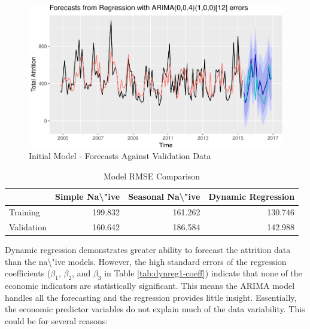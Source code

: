 \documentclass[12pt,letterpaper,toc=flat,oneside]{report}
\theoremstyle{definition}
\theoremstyle{definition}
\theoremstyle{definition}
\theoremstyle{remark}
\begin{document}
\begin{figure}[H]

{\centering \includegraphics{elliott-econometric-personnel-retention-18_files/figure-latex/dynreg1-forecast-1} 

}

\caption{Initial Model - Forecasts Against Validation Data}\label{fig:dynreg1-forecast}
\end{figure}

\begin{table}[!h]

\caption{\label{tab:model-compare-1}Model RMSE Comparison}
\centering
\begin{tabular}[t]{lrrr}
\toprule
\bfseries{ } & \bfseries{Simple Na\textbackslash{}"ive} & \bfseries{Seasonal Na\textbackslash{}"ive} & \bfseries{Dynamic Regression}\\
\midrule
Training & 199.832 & 161.262 & 130.746\\
Validation & 160.642 & 186.584 & 142.988\\
\bottomrule
\end{tabular}
\end{table}

Dynamic regression demonstrates greater ability to forecast the
attrition data than the na\textbackslash{}"ive models. However, the high
standard errors of the regression coefficients (\(\beta_1\),
\(\beta_2\), and \(\beta_3\) in Table \ref{tab:dynreg1-coeff}) indicate
that none of the economic indicators are statistically significant. This
means the ARIMA model handles all the forecasting and the regression
provides little insight. Essentially, the economic predictor variables
do not explain much of the data variability. This could be for several
reasons:
\end{document}
